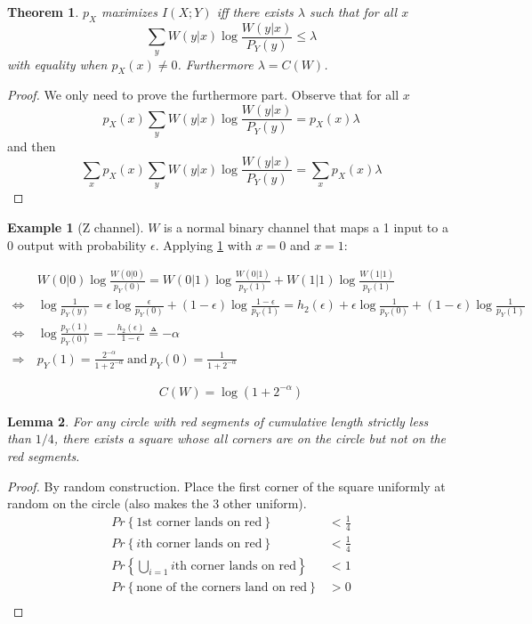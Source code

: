 \documentclass{article}
\newtheorem{theorem}{Theorem}[section]
\newtheorem{lemma}[theorem]{Lemma}
\theoremstyle{definition} %
\newtheorem{example}{Example}
\renewcommand{\Pr}[1]{Pr\left\{#1\right\}}
\begin{document}
\begin{theorem}
  \label{th:1000}
  $p_X$ maximizes $I(X;Y)$ iff there exists $\lambda$ such that for all $x$
  \[
    \sum_y W(y|x) \log \frac {W(y|x)} {P_Y(y)} \leq \lambda
  \]
  with equality when $p_X(x) \not= 0$. Furthermore $\lambda = C(W)$.
\end{theorem}

\begin{proof}
  We only need to prove the furthermore part. Observe that for all $x$
  \[
    p_X(x) \sum_y W(y|x) \log \frac {W(y|x)} {P_Y(y)} =  p_X(x) \lambda
  \]
  and then
  \[
    \sum_x p_X(x) \sum_y W(y|x) \log \frac {W(y|x)} {P_Y(y)} =  \sum_x p_X(x) \lambda
  \]
\end{proof}

\begin{example}[Z channel]
  $W$ is a normal binary channel that maps a 1 input to a 0 output with probability $\epsilon$. Applying \cref{th:1000} with $x=0$ and $x=1$:

  \begin{align*}
    &W(0|0)\log \frac {W(0|0)} {p_Y(0)} = W(0|1)\log \frac {W(0|1)} {p_Y(1)} + W(1|1)\log \frac {W(1|1)} {p_Y(1)}\\
    \iff& \log \frac 1 {p_Y(y)} = \epsilon \log \frac \epsilon {p_Y(0)} + (1-\epsilon) \log \frac {1-\epsilon} {p_Y(1)} = h_2(\epsilon) + \epsilon \log \frac 1 {p_Y(0)} + (1-\epsilon)\log\frac 1 {p_Y(1)}\\
    \iff&\log \frac {p_Y(1)} {p_Y(0)} = - \frac {h_2(\epsilon)}{1-\epsilon} \triangleq -\alpha\\
    \Longrightarrow~&p_Y(1) = \frac {2^{-\alpha}} { 1+2^{-\alpha}} ~\text{and}~p_Y(0) = \frac 1 {1+2^{-\alpha}}
  \end{align*}

  \[
    C(W) = \log (1+2^{-\alpha})
  \]
\end{example}


\begin{lemma}
  For any circle with red segments of cumulative length strictly less than $1/4$, there exists a square whose all corners are on the circle but not on the red segments.
\end{lemma}

\begin{proof}
  By random construction. Place the first corner of the square uniformly at random on the circle (also makes the 3 other uniform).
  \begin{align*}
    \Pr{\text{1st corner lands on red}} &< \frac 1 4\\
    \Pr{i\text{th corner lands on red}} &< \frac 1 4\\
    \Pr{\bigcup\limits_{i=1} i\text{th corner lands on red}} &< 1\\
    \Pr{\text{none of the corners land on red}} &> 0\\
  \end{align*}
\end{proof}
\end{document}
